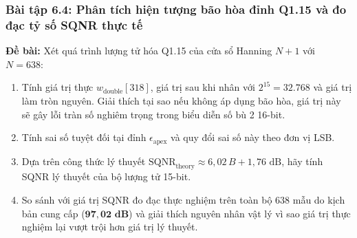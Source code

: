\subsubsection*{Bài tập 6.4: Phân tích hiện tượng bão hòa đỉnh Q1.15 và đo đạc tỷ số SQNR thực tế}
\textbf{Đề bài:} Xét quá trình lượng tử hóa Q1.15 của cửa sổ Hanning $N+1$ với $N = 638$:
\begin{enumerate}[label=(\alph*)]
    \item Tính giá trị thực $w_{\text{double}}[318]$, giá trị sau khi nhân với $2^{15} = 32.768$ và giá trị làm tròn nguyên. Giải thích tại sao nếu không áp dụng bão hòa, giá trị này sẽ gây lỗi tràn số nghiêm trọng trong biểu diễn số bù 2 16-bit.
    \item Tính sai số tuyệt đối tại đỉnh $\epsilon_{\text{apex}}$ và quy đổi sai số này theo đơn vị LSB.
    \item Dựa trên công thức lý thuyết $\text{SQNR}_{\text{theory}} \approx 6{,}02\,B + 1{,}76\text{ dB}$, hãy tính SQNR lý thuyết của bộ lượng tử 15-bit.
    \item So sánh với giá trị SQNR đo đạc thực nghiệm trên toàn bộ 638 mẫu do kịch bản  cung cấp ($\mathbf{97{,}02\text{ dB}}$) và giải thích nguyên nhân vật lý vì sao giá trị thực nghiệm lại vượt trội hơn giá trị lý thuyết.
\end{enumerate}

